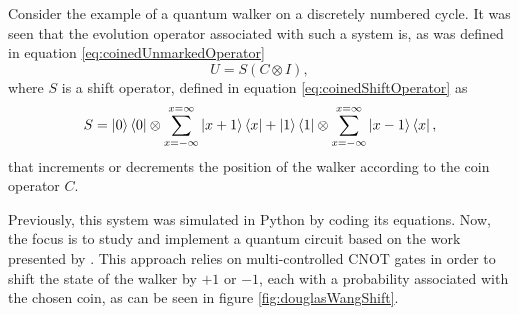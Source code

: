 \documentclass[../../dissertation.tex]{subfiles}
\begin{document}
Consider the example of a quantum walker on a discretely numbered cycle. It was
seen that the evolution operator associated with such a system is, as was
defined in equation \ref{eq:coinedUnmarkedOperator}
\begin{equation}
	   U = S(C\otimes I), 
           \label{eq:coinedUnmarkedOperatorQiskit}
\end{equation}
where $S$ is a shift operator, defined in equation \ref{eq:coinedShiftOperator}
as 
\begin{equation}
          S = \ket{0}\bra{0} \otimes \sum_{x=-\infty}^{x=\infty} \ket{x+1}\bra{x} + \ket{1}\bra{1}\otimes \sum_{x=-\infty}^{x=\infty} \ket{x-1}\bra{x},
	  \label{eq:shiftMatrixQiskit}
\end{equation} 
that increments or decrements the position of the walker according to the coin operator $C$.\par
Previously, this system was simulated in Python by coding its equations.  Now,
the focus is to study and implement a quantum circuit based on the work
presented by \cite{douglaswang07}. This approach relies on multi-controlled
CNOT gates in order to shift the state of the walker by $+1$ or $-1$, each with
a probability associated with the chosen coin, as can be seen in figure
\ref{fig:douglasWangShift}. 
\end{document}
